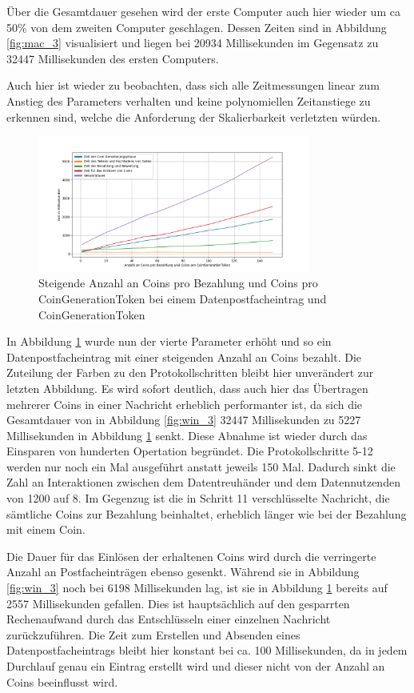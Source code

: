 \documentclass[
	fontsize=12pt,
	headings=small,
	parskip=half,           %
	bibliography=totoc,
	numbers=noenddot,       %
	open=any,               %
]{scrreprt}
\begin{document}
Über die Gesamtdauer gesehen wird der erste Computer auch hier wieder um ca 50\% von dem zweiten Computer geschlagen. Dessen Zeiten sind in Abbildung \ref{fig:mac_3} visualisiert und liegen bei 20934 Millisekunden im Gegensatz zu 32447 Millisekunden des ersten Computers. 

Auch hier ist wieder zu beobachten, dass sich alle Zeitmessungen linear zum Anstieg des Parameters verhalten und keine polynomiellen Zeitanstiege zu erkennen sind, welche die Anforderung der Skalierbarkeit verletzten würden.


\begin{figure}[H]
    \caption{Steigende Anzahl an Coins pro Bezahlung und Coins pro CoinGenerationToken bei einem Datenpostfacheintrag und CoinGenerationToken}
    \label{fig:win_4}
    \centering
    \includegraphics[width=0.8\textwidth]{figure_win_4.png}
\end{figure}
In Abbildung \ref{fig:win_4} wurde nun der vierte Parameter erhöht und so ein Datenpostfacheintrag mit einer steigenden Anzahl an Coins bezahlt. Die Zuteilung der Farben zu den Protokollschritten bleibt hier unverändert zur letzten Abbildung. Es wird sofort deutlich, dass auch hier das Übertragen mehrerer Coins in einer Nachricht erheblich performanter ist, da sich die Gesamtdauer von in Abbildung \ref{fig:win_3} 32447 Millisekunden zu 5227 Millisekunden in Abbildung \ref{fig:win_4} senkt. Diese Abnahme ist wieder durch das Einsparen von hunderten Opertation begründet. Die Protokollschritte 5-12 werden nur noch ein Mal ausgeführt anstatt jeweils 150 Mal. Dadurch sinkt die Zahl an Interaktionen zwischen dem Datentreuhänder und dem Datennutzenden von 1200 auf 8. Im Gegenzug ist die in Schritt 11 verschlüsselte Nachricht, die sämtliche Coins zur Bezahlung beinhaltet, erheblich länger wie bei der Bezahlung mit einem Coin.

Die Dauer für das Einlösen der erhaltenen Coins wird durch die verringerte Anzahl an Postfacheinträgen ebenso gesenkt. Während sie in Abbildung \ref{fig:win_3} noch bei 6198 Millisekunden lag, ist sie in Abbildung \ref{fig:win_4} bereits auf 2557 Millisekunden gefallen. Dies ist hauptsächlich auf den gesparrten Rechenaufwand durch das Entschlüsseln einer einzelnen Nachricht zurückzuführen. Die Zeit zum Erstellen und Absenden eines Datenpostfacheintrags bleibt hier konstant bei ca. 100 Millisekunden, da in jedem Durchlauf genau ein Eintrag erstellt wird und dieser nicht von der Anzahl an Coins beeinflusst wird.
\end{document}
